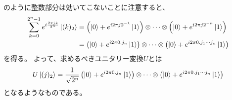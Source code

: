\documentclass[]{ltjsarticle}
\begin{document}
のように整数部分は効いてこないことに注意すると、
\begin{align}
    \sum_{k=0}^{2^n-1}
    e^{i\frac{2\pi jk}{2^n}}
    \ket{(k)_2}    
    &=
    \left(
        \ket{0} 
        + 
        e^{i2\pi j 2^{-1}} \ket{1}
    \right)
    \otimes 
    \cdots 
    \otimes 
    \left(
        \ket{0} 
        + 
        e^{i2\pi j 2^{-n}} \ket{1}
    \right) \\
    &=
    \left(
        \ket{0} 
        + 
        e^{i2\pi 0.j_n} \ket{1}
    \right)
    \otimes 
    \cdots 
    \otimes 
    \left(
        \ket{0} 
        + 
        e^{i2\pi 0.j_1 \cdots j_n} \ket{1}
    \right)
\end{align}
を得る。
よって、求めるべきユニタリー変換$U$とは
\begin{align}
    U \ket{(j)_2}
    =
    \frac{1}{\sqrt{2^n}}
    \left(
        \ket{0} 
        + 
        e^{i2\pi 0.j_n} \ket{1}
    \right)
    \otimes 
    \cdots 
    \otimes 
    \left(
        \ket{0} 
        + 
        e^{i2\pi 0.j_1 \cdots j_n} \ket{1}
    \right)
\end{align}
となるようなものである。
\end{document}
